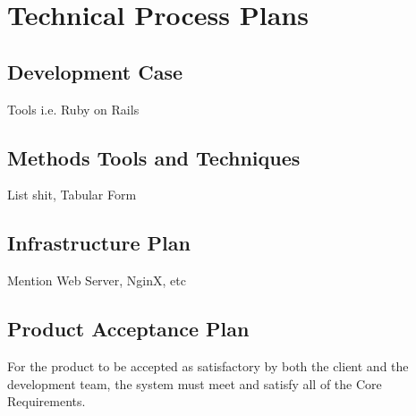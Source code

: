 
\chapter{Technical Process Plans} %

\label{Part6Chapter5} %



\section{Development Case}

Tools i.e. Ruby on Rails


\section{Methods Tools and Techniques}

List shit, Tabular Form


\section{Infrastructure Plan}

Mention Web Server, NginX, etc


\section{Product Acceptance Plan}

For the product to be accepted as satisfactory by both the client and the development team, the system must meet and satisfy all of the Core Requirements.



